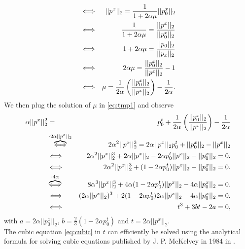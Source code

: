\documentclass{scrreprt}
\begin{document}
\begin{enumerate}
\begin{eqnarray}
                    &\Longleftrightarrow& ||p^{x}||_{2} = \frac{1}{1 + 2 \alpha \mu} ||p_{0}^{x}||_{2} \notag \\
                    &\Longleftrightarrow& \frac{1}{1 + 2 \alpha \mu} = \frac{||p^{x}||_{2}}{||p_{0}^{x}||_{2}} \notag \\
                    &\Longleftrightarrow& 1 + 2\alpha\mu = \frac{||p_{0}||_{2}}{||p_{x}||_{2}} \notag \\
                    &\Longleftrightarrow& 2 \alpha \mu = \frac{||p_{0}^{x}||_{2}}{||p^{x}||_{2}} - 1 \notag \\
                    &\Longleftrightarrow& \mu = \frac{1}{2 \alpha} \left( \frac{||p_{0}^{x}||_{2}}{||p^{x}||_{2}} \right) - \frac{1}{2\alpha}. \notag
                \end{eqnarray}
            We then plug the solution of $\mu$ in \ref{eq:tmp1} and observe
                \begin{eqnarray}
                    \alpha ||p^{x}||_{2}^{2} &=& p_{0}^{t} + \frac{1}{2 \alpha} \left( \frac{||p_{0}^{x}||_{2}}{||p^{x}||_{2}} \right) - \frac{1}{2\alpha} \notag \\
                    &\overbrace{\Longleftrightarrow}^{\cdot 2 \alpha ||p^{x}||_{2}}& 2 \alpha^{2} ||p^{x}||_{2}^{3} = 2 \alpha ||p^{x}||_{2} p_{0}^{t} + ||p_{0}^{x}||_{2} - ||p^{x}||_{2} \notag \\
                    &\Longleftrightarrow& 2 \alpha^{2} ||p^{x}||_{2}^{3} + 2\alpha||p^{x}||_{2} - 2\alpha p_{0}^{t} ||p^{x}||_{2} - ||p_{0}^{x}||_{2} = 0. \notag \\
                    &\Longleftrightarrow& 2 \alpha^{2} ||p^{x}||_{2}^{3} + (1 - 2 \alpha p_{0}^{t}) ||p^{x}||_{2} - ||p_{0}^{x}||_{2} = 0. \notag \\
                    &\overbrace{\Longleftrightarrow}^{\cdot 4 \alpha}& 8 \alpha^{3} ||p^{x}||_{2}^{3} + 4 \alpha (1 - 2 \alpha p_{0}^{t}) ||p^{x}||_{2} - 4 \alpha ||p_{0}^{x}||_{2} = 0. \notag \\
                    &\Longleftrightarrow& (2 \alpha ||p^{x}||_{2})^{3} + 2 (1 - 2 \alpha p_{0}^{t}) 2 \alpha ||p^{x}||_{2} - 4 \alpha ||p_{0}^{x}||_{2} = 0. \notag \\
                    &\Longleftrightarrow& t^{3} + 3bt - 2a = 0, \label{eq:cubic}
                \end{eqnarray}
            with $a = 2 \alpha ||p_{0}^{x}||_{2}$, $b = \frac{2}{3}(1 - 2 \alpha p_{0}^{t})$ and $t = 2 \alpha ||p^{x}||_{2}$.\\
            The cubic equation \ref{eq:cubic} in $t$ can efficiently be solved using the analytical formula for solving cubic equations published by J. P. McKelvey in 1984 in \cite{kelvey-ajp}.
            \end{enumerate}
\end{document}
